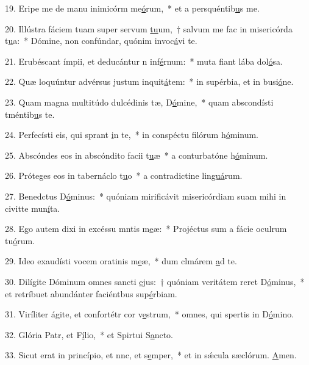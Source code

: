 19. Eripe me de manu inimicórm me\uline{ó}rum,~* et a persquéntib\uline{u}s me.\par 
20. Illústra fáciem tuam super servum \uline{tu}um,~† salvum me fac in misericórda t\uline{u}a:~* Dómine, non confúndar, quónim invoc\uline{á}vi te.\par 
21. Erubéscant ímpii, et deducántur n inf\uline{é}rnum:~* muta fiant lába dol\uline{ó}sa.\par 
22. Quæ loquúntur advérsus justum inquit\uline{á}tem:~* in supérbia, et in busi\uline{ó}ne.\par 
23. Quam magna multitúdo dulcédinis tæ, D\uline{ó}mine,~* quam abscondísti tméntib\uline{u}s te.\par 
24. Perfecísti eis, qui sprant \uline{i}n te,~* in conspéctu filórum h\uline{ó}minum.\par 
25. Abscóndes eos in abscóndito facii t\uline{u}æ~* a conturbatóne h\uline{ó}minum.\par 
26. Próteges eos in tabernáclo t\uline{u}o~* a contradictine lin\uline{guá}rum.\par 
27. Benedctus D\uline{ó}minus:~* quóniam mirificávit misericórdiam suam mihi in civitte mun\uline{í}ta.\par 
28. Ego autem dixi in excéssu mntis m\uline{e}æ:~* Projéctus sum a fácie oculrum tu\uline{ó}rum.\par 
29. Ideo exaudísti vocem oratinis m\uline{e}æ,~* dum clmárem \uline{a}d te.\par 
30. Dilígite Dóminum omnes sancti \uline{e}jus:~† quóniam veritátem reret D\uline{ó}minus,~* et retríbuet abundánter faciéntbus sup\uline{é}rbiam.\par 
31. Viríliter ágite, et confortétr cor v\uline{e}strum,~* omnes, qui spertis in D\uline{ó}mino.\par 
32. Glória Patr, et F\uline{í}lio,~* et Spirtui S\uline{a}ncto.\par 
33. Sicut erat in princípio, et nnc, et s\uline{e}mper,~* et in sǽcula sæclórum. \uline{A}men.\par 
